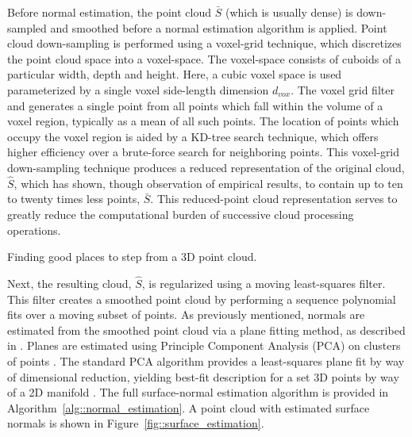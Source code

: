 			Before normal estimation, the point cloud $\bar{S}$ (which is usually dense) is down-sampled and smoothed before a normal estimation algorithm is applied. Point cloud down-sampling is performed using a voxel-grid technique, which discretizes the point cloud space into a voxel-space. The voxel-space consists of cuboids of a particular width, depth and height. Here, a cubic voxel space is used parameterized by a single voxel side-length dimension $d_{vox}$. The voxel grid filter and generates a single point from all points which fall within the volume of a voxel region, typically as a mean of all such points. The location of points which occupy the voxel region is aided by a KD-tree search technique, which offers higher efficiency over a brute-force search for neighboring points. This voxel-grid down-sampling technique produces a reduced representation of the original cloud, $\hat{S}$, which has shown, though observation of empirical results, to contain up to ten to twenty times less points, $\bar{S}$. This reduced-point cloud representation serves to greatly reduce the computational burden of successive cloud processing operations.
			
			\begin{algorithm}[!h]
				\begin{algorithmic}
						\EndIf
					\EndFor
				\end{algorithmic}	
				\caption{Finding good places to step from a 3D point cloud.}
				\label{alg::goodspacestostep}
			\end{algorithm}

			Next, the resulting cloud, $\hat{S}$, is regularized using a moving least-squares filter. This filter creates a smoothed point cloud by performing a sequence polynomial fits over a moving subset of points. As previously mentioned, normals are estimated from the smoothed point cloud via a plane fitting method, as described in \cite{Mitra2003}. Planes are estimated using Principle Component Analysis (PCA) on clusters of points \cite{Castillo2013}. The standard PCA algorithm provides a least-squares plane fit by way of dimensional reduction, yielding best-fit description for a set 3D points by way of a 2D manifold \cite{Pearson1901}. The full surface-normal estimation algorithm is provided in Algorithm~\ref{alg::normal_estimation}. A point cloud with estimated surface normals is shown in Figure~\ref{fig::surface_estimation}.

